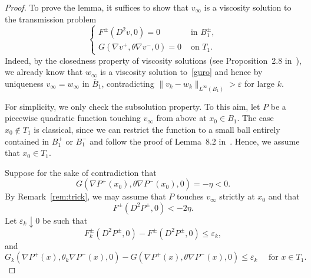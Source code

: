 \documentclass[letter,11pt]{amsart}
\newcommand{\vep}{\varepsilon}
\theoremstyle{definition}
\numberwithin{equation}{section}
\begin{document}
\begin{proof}
\medskip

To prove the lemma, it suffices to show that $v_{\infty}$ is a viscosity solution to the transmission problem
\begin{equation}
\label{guro}
\begin{cases}
F^{\pm}(D^2 v, 0) = 0 & \text{ in } B_{1}^{\pm},\\
G(\nabla v^{+}, \theta \nabla v^{-}, 0) = 0 & \text{ on } T_{1}.
\end{cases}
\end{equation}
Indeed, by the closedness property of viscosity solutions (see Proposition~2.8 in~\cite{E}), we already know that $w_{\infty}$ is a viscosity solution to~\eqref{guro} and hence by uniqueness $v_{\infty} = w_{\infty}$ in $\overline{B}_{1}$, contradicting $\|v_k - w_k\|_{L^{\infty}(B_1)}> \vep$ for large $k$.

\medskip

For simplicity, we only check the subsolution property.
To this aim, let $P$ be a piecewise quadratic function touching $v_{\infty}$ from above at $x_0 \in B_1$.
The case $x_0 \notin T_1$ is classical, since we can restrict the function to a small ball entirely contained in $B_1^{+}$ or $B_1^{-}$ and follow the proof of Lemma~8.2 in~\cite{CC}.
Hence, we assume that $x_0 \in T_1$.

\medskip

Suppose for the sake of contradiction that
\begin{equation}
\label{contra1}
G(\nabla P^{+}(x_0), \theta \nabla P^{-}(x_0), 0) = - \eta < 0.
\end{equation}
By Remark~\ref{rem:trick}, we may assume that $P$ touches $v_{\infty}$ strictly at $x_0$ and that
\begin{equation}
\label{contra2}
F^{\pm}(D^2 P^{\pm}, 0) < - 2\eta.
\end{equation}
Let $\vep_k \downarrow 0$ be such that 
\[
F^{\pm}_k(D^2 P^{\pm}, 0) - F^{\pm}(D^2 P^{\pm}, 0) \leq \vep_k,
\]
and
\[
G_k(\nabla P^{+}(x), \theta_k \nabla P^{-}(x), 0) - G(\nabla P^{+}(x), \theta \nabla P^{-}(x), 0) \leq \vep_k \quad \text{ for } x \in T_1.
\]

\medskip


\end{proof}
\end{document}
